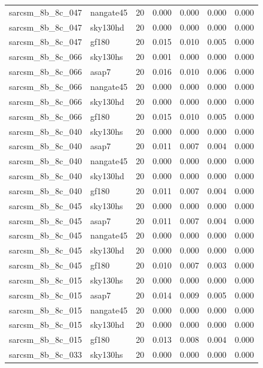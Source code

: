 \begin{tabular}{llrrrrr}
sarcsm\_8b\_8c\_047 & nangate45 & 20 & 0.000 & 0.000 & 0.000 & 0.000 \\
sarcsm\_8b\_8c\_047 & sky130hd & 20 & 0.000 & 0.000 & 0.000 & 0.000 \\
sarcsm\_8b\_8c\_047 & gf180 & 20 & 0.015 & 0.010 & 0.005 & 0.000 \\
sarcsm\_8b\_8c\_066 & sky130hs & 20 & 0.001 & 0.000 & 0.000 & 0.000 \\
sarcsm\_8b\_8c\_066 & asap7 & 20 & 0.016 & 0.010 & 0.006 & 0.000 \\
sarcsm\_8b\_8c\_066 & nangate45 & 20 & 0.000 & 0.000 & 0.000 & 0.000 \\
sarcsm\_8b\_8c\_066 & sky130hd & 20 & 0.000 & 0.000 & 0.000 & 0.000 \\
sarcsm\_8b\_8c\_066 & gf180 & 20 & 0.015 & 0.010 & 0.005 & 0.000 \\
sarcsm\_8b\_8c\_040 & sky130hs & 20 & 0.000 & 0.000 & 0.000 & 0.000 \\
sarcsm\_8b\_8c\_040 & asap7 & 20 & 0.011 & 0.007 & 0.004 & 0.000 \\
sarcsm\_8b\_8c\_040 & nangate45 & 20 & 0.000 & 0.000 & 0.000 & 0.000 \\
sarcsm\_8b\_8c\_040 & sky130hd & 20 & 0.000 & 0.000 & 0.000 & 0.000 \\
sarcsm\_8b\_8c\_040 & gf180 & 20 & 0.011 & 0.007 & 0.004 & 0.000 \\
sarcsm\_8b\_8c\_045 & sky130hs & 20 & 0.000 & 0.000 & 0.000 & 0.000 \\
sarcsm\_8b\_8c\_045 & asap7 & 20 & 0.011 & 0.007 & 0.004 & 0.000 \\
sarcsm\_8b\_8c\_045 & nangate45 & 20 & 0.000 & 0.000 & 0.000 & 0.000 \\
sarcsm\_8b\_8c\_045 & sky130hd & 20 & 0.000 & 0.000 & 0.000 & 0.000 \\
sarcsm\_8b\_8c\_045 & gf180 & 20 & 0.010 & 0.007 & 0.003 & 0.000 \\
sarcsm\_8b\_8c\_015 & sky130hs & 20 & 0.000 & 0.000 & 0.000 & 0.000 \\
sarcsm\_8b\_8c\_015 & asap7 & 20 & 0.014 & 0.009 & 0.005 & 0.000 \\
sarcsm\_8b\_8c\_015 & nangate45 & 20 & 0.000 & 0.000 & 0.000 & 0.000 \\
sarcsm\_8b\_8c\_015 & sky130hd & 20 & 0.000 & 0.000 & 0.000 & 0.000 \\
sarcsm\_8b\_8c\_015 & gf180 & 20 & 0.013 & 0.008 & 0.004 & 0.000 \\
sarcsm\_8b\_8c\_033 & sky130hs & 20 & 0.000 & 0.000 & 0.000 & 0.000 \\

\end{tabular}
